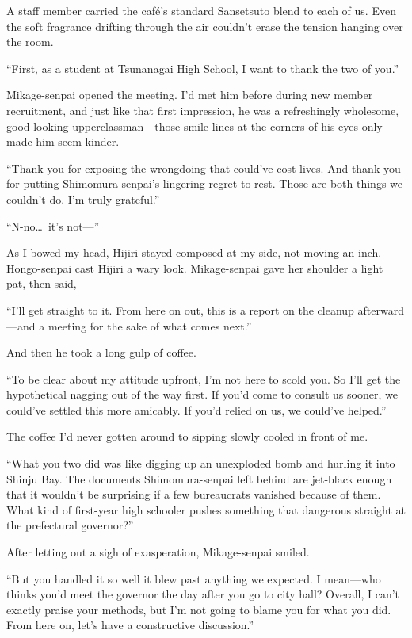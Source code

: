 \documentclass[
    a4paper,
    12pt,
    twoside,
    openany,
    UTF8,
    fontset=windows
]{ctexbook}
\begin{document}
A staff member carried the café's standard Sansetsuto blend to each of us. Even the soft fragrance drifting through the air couldn't erase the tension hanging over the room.

``First, as a student at Tsunanagai High School, I want to thank the two of you.''

Mikage-senpai opened the meeting. I'd met him before during new member recruitment, and just like that first impression, he was a refreshingly wholesome, good-looking upperclassman---those smile lines at the corners of his eyes only made him seem kinder.

``Thank you for exposing the wrongdoing that could've cost lives. And thank you for putting Shimomura-senpai's lingering regret to rest. Those are both things we couldn't do. I'm truly grateful.''

``N-no\dots\ it's not---''

As I bowed my head, Hijiri stayed composed at my side, not moving an inch. Hongo-senpai cast Hijiri a wary look. Mikage-senpai gave her shoulder a light pat, then said,

``I'll get straight to it. From here on out, this is a report on the cleanup afterward---and a meeting for the sake of what comes next.''

And then he took a long gulp of coffee.

``To be clear about my attitude upfront, I'm not here to scold you. So I'll get the hypothetical nagging out of the way first. If you'd come to consult us sooner, we could've settled this more amicably. If you'd relied on us, we could've helped.''

The coffee I'd never gotten around to sipping slowly cooled in front of me.

``What you two did was like digging up an unexploded bomb and hurling it into Shinju Bay. The documents Shimomura-senpai left behind are jet-black enough that it wouldn't be surprising if a few bureaucrats vanished because of them. What kind of first-year high schooler pushes something that dangerous straight at the prefectural governor?''

After letting out a sigh of exasperation, Mikage-senpai smiled.

``But you handled it so well it blew past anything we expected. I mean---who thinks you'd meet the governor the day after you go to city hall? Overall, I can't exactly praise your methods, but I'm not going to blame you for what you did. From here on, let's have a constructive discussion.''
\end{document}
